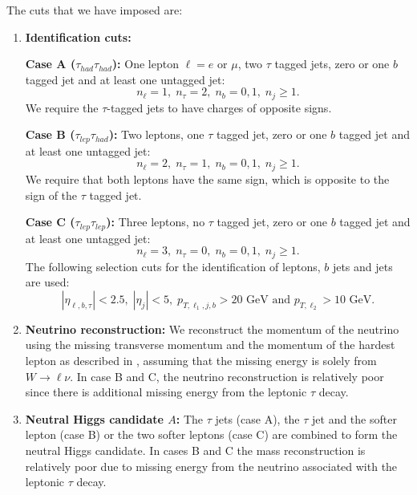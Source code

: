 The cuts that we have imposed are:
\begin{enumerate}

\item \textbf{Identification cuts:} 

\textbf{Case A ($\tau_{had}\tau_{had}$):}  {One lepton $\ell = e$ or $\mu$, two $\tau$ tagged jets, zero or one $b$ tagged jet and at least one untagged jet:} 
\begin{equation}
n_{\ell} = 1, \;  n_{\tau} = 2, \; n_b = 0,1 ,\; n_{j} \geq 1.
\label{eqA}
\end{equation}
We require the $\tau$-tagged jets to have charges of opposite signs.

\textbf{Case B ($\tau_{lep}\tau_{had}$):}  {Two leptons, one $\tau$ tagged jet, zero or one $b$ tagged jet and at least one untagged jet:}
\begin{equation}
n_{\ell} = 2, \; n_{\tau} = 1,\; n_b = 0,1 , \;n_{j} \geq 1.
\label{eqB}
\end{equation}
We require that both leptons have the same sign, which is opposite to the sign of the $\tau$ tagged jet.

\textbf{Case C ($\tau_{lep}\tau_{lep}$):}  {Three leptons, no $\tau$ tagged jet, zero or one $b$ tagged jet and at least one untagged jet:}
\begin{equation}
n_{\ell} = 3, \; n_{\tau} = 0, \; n_b = 0,1 ,\; n_{j} \geq 1.
\label{eqC}
\end{equation}
The following selection cuts for the identification of leptons, $b$ jets and jets are used:
\begin{equation}
|\eta_{\ell,b,\tau}| < 2.5, \; |\eta_{j}| < 5, \; p_{T, \ell_1, j, b} > 20 \text{ GeV and } p_{T, \ell_{2}} > 10 \text{ GeV.}
\label{eqID}
\end{equation}


\item \textbf{Neutrino reconstruction:}  
We reconstruct the  momentum of the neutrino using the missing transverse momentum  and the momentum of the hardest lepton as described in \cite{Aad:2012ux}, assuming that the missing energy is solely from $W\rightarrow \ell \nu$.    In case B and C, the neutrino reconstruction  is relatively poor since there is additional missing energy from the leptonic $\tau$ decay. 

\item \textbf{Neutral Higgs candidate $A$:} The $\tau$ jets (case A), the $\tau$ jet and the softer lepton (case B) or the two softer leptons (case C) are combined to form the neutral Higgs candidate.   {In cases B and C the mass reconstruction is  relatively poor due to missing energy from the neutrino associated with the leptonic $\tau$ decay. }


\end{enumerate}
